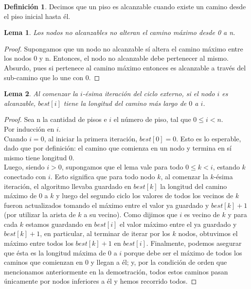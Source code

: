 \documentclass{article}
\newtheorem{lemma}{Lema}[theorem]
\theoremstyle{definition}
\newtheorem{definition}{Definición}[section]
\theoremstyle{remark}
\begin{document}
\begin{definition}
Decimos que un piso es alcanzable cuando existe un camino desde el piso inicial hasta él.
\end{definition}

\begin{lemma}
Los nodos no alcanzables no alteran el camino máximo desde 0 a n.
\end{lemma}

\begin{proof}
Supongamos que un nodo no alcanzable sí altera el camino máximo entre los nodos 0 y n. Entonces, el nodo no alcanzable debe pertenecer al mismo. Absurdo, pues si pertenece al camino máximo entonces es alcanzable a través del sub-camino que lo une con 0.
\end{proof}

\begin{lemma}
Al comenzar la $i$-ésima iteración del ciclo externo, si el nodo $i$ es alcanzable, $best[i]$ tiene la longitud del camino más largo de $0$ a $i$.
\end{lemma}

\begin{proof}
Sea n la cantidad de pisos e $i$ el número de piso, tal que $0 \leq i < n$. \\
Por inducción en $i$. \\

Cuando $i = 0$, al iniciar la primera iteración, $best[0] = 0$. Esto es lo esperable, dado que por definición: el camino que comienza en un nodo y termina en sí mismo tiene longitud 0. \\

Luego, siendo $i > 0$, supongamos que el lema vale para todo $0 \leq k < i$, estando $k$ conectado con $i$. Esto significa que para todo nodo $k$, al comenzar la $k$-ésima iteración, el algoritmo llevaba guardado en $best[k]$ la longitud del camino máximo de $0$ a $k$ y luego del segundo ciclo los valores de todos los vecinos de $k$ fueron actualizados tomando el máximo entre el valor ya guardado y $best[k]+1$ (por utilizar la arista de $k$ a su vecino). Como dijimos que $i$ es vecino de $k$ y para cada $k$ estamos guardando en $best[i]$ el valor máximo entre el ya guardado y $best[k]+1$, en particular, al terminar de iterar por los $k$ nodos, obtuvimos el máximo entre todos los $best[k]+1$ en $best[i]$. Finalmente, podemos asegurar que ésta es la longitud máxima de $0$ a $i$ porque debe ser el máximo de todos los caminos que comienzan en 0 y llegan a él; y, por la condición de orden que mencionamos anteriormente en la demostración, todos estos caminos pasan únicamente por nodos inferiores a él y hemos recorrido todos.
\end{proof}
\end{document}
